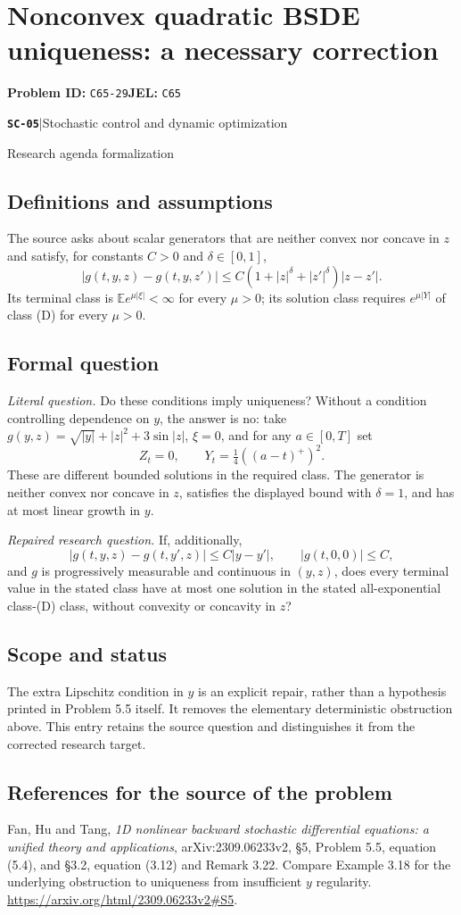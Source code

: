 \documentclass[11pt,a4paper]{article}
\newcommand{\E}{\mathbb E}
\newcommand{\entrymeta}[3]{{\sffamily\small\color{muted}\textbf{\texttt{#1}}\quad|\quad #2\par #3\par}}
\begin{document}
\section*{Nonconvex quadratic BSDE uniqueness: a necessary correction}
\textbf{Problem ID:} \texttt{C65-29}\quad \textbf{JEL:} \texttt{C65}\par
\label{problem:OP-0566}
\label{beyond:SC-05}
\entrymeta{SC-05}{Stochastic control and dynamic optimization}{Research agenda formalization}
\subsection*{Definitions and assumptions}
The source asks about scalar generators that are neither convex nor
concave in $z$ and satisfy, for constants $C>0$ and $\delta\in[0,1]$,
\[
 |g(t,y,z)-g(t,y,z')|
 \leq C(1+|z|^\delta+|z'|^\delta)|z-z'|.
\]
Its terminal class is $\E e^{\mu|\xi|}<\infty$ for every $\mu>0$;
its solution class requires $e^{\mu|Y|}$ of class (D) for every $\mu>0$.
\subsection*{Formal question}
\emph{Literal question.} Do these conditions imply uniqueness?
Without a condition controlling dependence on $y$, the answer is no:
take $g(y,z)=\sqrt{|y|}+|z|^2+3\sin|z|$, $\xi=0$, and for any $a\in[0,T]$ set
\[
 Z_t=0,\qquad Y_t=\tfrac14((a-t)^+)^2.
\]
These are different bounded solutions in the required class. The generator
is neither convex nor concave in $z$, satisfies the displayed bound with
$\delta=1$, and has at most linear growth in $y$.

\emph{Repaired research question.} If, additionally,
\[
 |g(t,y,z)-g(t,y',z)|\leq C|y-y'|,
 \qquad |g(t,0,0)|\leq C,
\]
and $g$ is progressively measurable and continuous in $(y,z)$,
does every terminal value in the stated class have at most one solution
in the stated all-exponential class-(D) class, without convexity or
concavity in $z$?
\subsection*{Scope and status}
The extra Lipschitz condition in $y$ is an explicit repair, rather than
a hypothesis printed in Problem 5.5 itself. It removes the elementary
deterministic obstruction above. This entry retains the source question
and distinguishes it from the corrected research target.
\subsection*{References for the source of the problem}
Fan, Hu and Tang, \emph{1D nonlinear backward stochastic differential
equations: a unified theory and applications}, arXiv:2309.06233v2,
\S5, Problem 5.5, equation (5.4), and \S3.2, equation (3.12) and
Remark 3.22. Compare Example 3.18 for the underlying obstruction to
uniqueness from insufficient $y$ regularity.
\url{https://arxiv.org/html/2309.06233v2#S5}.
\end{document}
